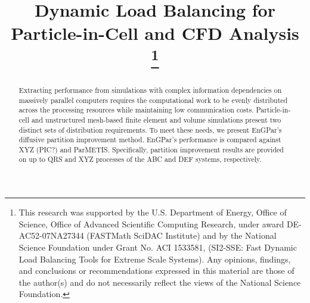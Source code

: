\documentclass[conference]{IEEEtran}
\begin{document}
\title{Dynamic Load Balancing for Particle-in-Cell and CFD Analysis\\
\thanks{
This research was supported by the U.S. Department of Energy, Office of
Science, Office of Advanced Scientific Computing Research, under award
DE-AC52-07NA27344 (FASTMath SciDAC Institute) and by the National Science
Foundation under Grant No.  ACI 1533581, (SI2-SSE: Fast Dynamic Load
Balancing Tools for Extreme Scale Systems).
Any opinions, findings, and conclusions or recommendations expressed in this
material are those of the author(s) and do not necessarily reflect the views
of the National Science Foundation.
}}

\author{
\and
{}
\and
{}
}

\maketitle

\begin{abstract}
  Extracting performance from simulations with complex information dependencies
  on massively parallel computers requires the computational work to be evenly
  distributed across the processing resources while maintaining low
  communication costs.
  Particle-in-cell and unstructured mesh-based finite element and volume
  simulations present two distinct sets of distribution requirements.
  To meet these needs, we present EnGPar's diffusive partition improvement
  method.
  EnGPar's performance is compared against XYZ (PIC?) and ParMETIS.
  Specifically, partition improvement results are provided on
  up to QRS and XYZ processes of the ABC and DEF systems, respectively.
\end{abstract}
\end{document}
